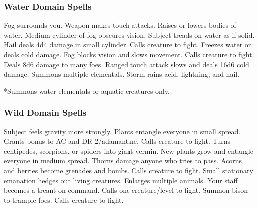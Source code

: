 \subsubsection{Water Domain Spells}

\begin{spelllist}
     Fog surrounds you.
    \spellhead[1]{}
     Weapon makes touch attacks. 
     Raises or lowers bodies of water.
     Medium cylinder of fog obscures vision.
    \spellhead[3]{}
     Subject treads on water as if solid.
     Hail deals 4d4 damage in small cylinder.
     Calls creature to fight.
    \spellhead[5]{}
    \spellhead[5]{}
     Freezes water or deals cold damage.
     Fog blocks vision and slows movement.
    \spellhead[7]{}
     Calls creature to fight.
     Deals 8d6 damage to many foes.
     Ranged touch attack slows and deals 16d6 cold damage.
     Summons multiple elementals.
     Storm rains acid, lightning, and hail.
\end{spelllist}
*Summons water elementals or aquatic creatures only.

\subsubsection{Wild Domain Spells}

\begin{spelllist}
     Subject feels gravity more strongly.
     Plants entangle everyone in small spread.
     Grants  bonus to AC and DR 2/adamantine.
    \spellhead[2]{}
    \spellhead[3]{}
     Calls creature to fight.
     Turns centipedes, scorpions, or spiders into giant vermin.
     New plants grow and entangle everyone in medium spread.
    \spellhead[5]{}
     Thorns damage anyone who tries to pass.
     Acorns and berries become grenades and bombs.
     Calls creature to fight.
     Small stationary emanation hedges out living creatures.
     Enlarges multiple animals.
     Your staff becomes a treant on command.
     Calls one creature/level to fight.
     Summon bison to trample foes.
     Calls creature to fight.
\end{spelllist}

